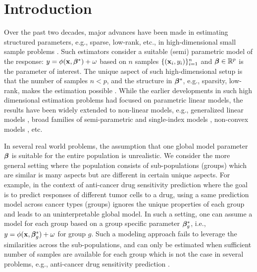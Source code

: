
\section{Introduction}
Over the past two decades, major advances have been made in estimating structured parameters, e.g., sparse, low-rank, etc., in high-dimensional small sample problems \cite{donoho2006compressed,candes2010power,friedman2008sparse}.
Such estimators consider a suitable (semi) parametric model of the response: $y = \phi(\mathbf{x},\boldsymbol{\beta}^*) + \omega$ based on $n$ samples $\{(\mathbf{x}_i,y_i)\}_{i=1}^n$ and $\boldsymbol{\beta} \in \mathbb R^p$
is the parameter of interest. The unique aspect of such high-dimensional setup is that the number of samples $n < p$, and the structure in $\boldsymbol{\beta}^*$, e.g., sparsity, low-rank, makes
the estimation possible \cite{tibshirani1996regression,candes2006robust,candes2009exact}. While the earlier developments in such high dimensional estimation problems had focused on parametric linear models, the results
have been widely extended to non-linear models, e.g., generalized linear models \cite{negahban2009unified,bach2012optimization}, broad families of semi-parametric and single-index models \cite{plan2017high,boufounos20081}, non-convex models \cite{blumensath2009iterative,jain2013low}, etc.

In several real world problems, the assumption that one global model parameter $\boldsymbol{\beta}$ is suitable for the entire population is unrealistic.
We consider the more general setting where the population consists of sub-populations (groups) which are similar is many aspects but are different in certain
unique aspects. For example, in the context of anti-cancer drug sensitivity prediction where the goal is to predict responses of different tumor cells to a drug, using a same prediction model across cancer types (groups) ignores the unique properties of each group and leads to an uninterpretable global model. 
%
%
In such a setting, one can assume a model for each group based on a group specific parameter $\boldsymbol{\beta}^*_g$, i.e., $y = \phi(\mathbf{x}, \boldsymbol{\beta}_g^*) + \omega$ for group $g$. 
Such a modeling approach fails to leverage the similarities across the sub-populations, and can only be estimated when sufficient number of samples are available 
for each group which is not the case in several problems, e.g., anti-cancer drug sensitivity prediction \cite{barretina2012cancer, iorio2016landscape1}.
%

